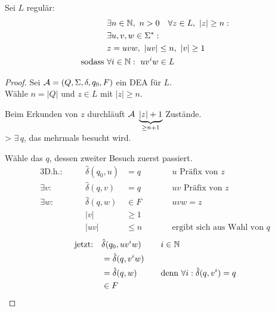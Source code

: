 \begin{lemma}\label{lem:pumping}
        Sei $L$ regulär:
        \begin{alignat*}{2}
                &\exists n\in\N,\ n>0\quad \forall z\in L,\ |z|\geq n:\\
                &\exists u,v,w\in\Sigma^* :\\
                &z = uvw,\ |uv| \leq n,\ |v| \geq 1\\
                \text{sodass }& \forall i\in\N:\ uv^iw\in L
        \end{alignat*}
\end{lemma}
\vspace{-1em}
\begin{proof}
	Sei $\mathcal{A}=(Q,\Sigma,\delta,q_0,F)$ ein \ac{DEA} für $L$.\\
	Wähle $n=|Q|$ und $z\in L$ mit $|z|\geq n$.
	
	Beim Erkunden von $z$ durchläuft $\mathcal{A}\ \underbrace{|z|+1}_{\geq n+1}$ Zustände.\\
	\-> $\exists\, q$, das mehrmals besucht wird.
	
	Wähle das $q$, dessen zweiter Besuch zuerst passiert.
	\begin{alignat*}{3}
		\text{D.h.}:&\quad& \hat\delta(q_0,u)&=q &\qquad& u\text{ Präfix von }z\\
		\exists v:&& \hat\delta(q,v)&=q && uv\text{ Präfix von }z\\
		\exists w:&& \hat\delta(q,w)&\in F && uvw=z\\
		&& |v| &\geq 1\\
		&& |uv| &\leq n && \text{ergibt sich aus Wahl von }q
	\end{alignat*}
	\begin{alignat*}{2}
		\text{jetzt:}\quad &\hat\delta(q_0,uv^iw) &\quad& i\in\mathbb{N}\\
		&= \hat\delta(q,v^iw)\\
		&= \hat\delta(q,w) && \text{denn }\forall i: \hat\delta(q,v^i)=q\\
		&\in F \tag*{\qedhere}
	\end{alignat*}
\end{proof}
%
